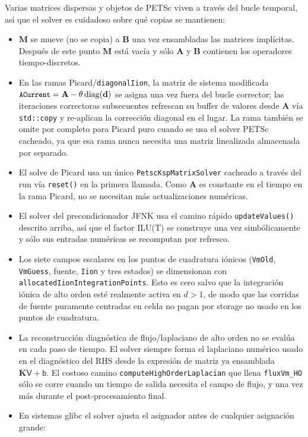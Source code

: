 \documentclass[11pt,a4paper]{article}
\newcommand{\code}[1]{\texttt{\small #1}}
\newcommand{\Mmass}{\mathbf{M}}
\newcommand{\Kstif}{\mathbf{K}}
\newcommand{\Aimp}{\mathbf{A}}
\newcommand{\Bimp}{\mathbf{B}}
\begin{document}
Varias matrices dispersas y objetos de PETSc viven a través del bucle temporal, así que el
solver es cuidadoso sobre qué copias se mantienen:
\begin{itemize}
\item $\Mmass$ se mueve (no se copia) a $\Bimp$ una vez ensambladas las matrices implícitas.
Después de este punto $\Mmass$ está vacía y sólo $\Aimp$ y $\Bimp$ contienen los operadores
tiempo-discretos.
\item En las ramas Picard/\code{diagonalIion}, la matriz de sistema modificada
$\code{ACurrent}=\Aimp-\theta\,\mathrm{diag}(\mathbf{d})$ se asigna una vez fuera del bucle
corrector; las iteraciones correctoras subsecuentes refrescan su buffer de valores desde
$\Aimp$ vía \code{std::copy} y re-aplican la corrección diagonal en el lugar. La rama también
se omite por completo para Picard puro cuando se usa el solver PETSc cacheado, ya que esa rama
nunca necesita una matriz linealizada almacenada por separado.
\item El solve de Picard usa un único \code{PetscKspMatrixSolver} cacheado a través del run vía
\code{reset()} en la primera llamada. Como $\Aimp$ es constante en el tiempo en la rama Picard,
no se necesitan más actualizaciones numéricas.
\item El solver del precondicionador JFNK usa el camino rápido \code{updateValues()} descrito
arriba, así que el factor ILU(T) se construye una vez simbólicamente y sólo sus entradas
numéricas se recomputan por refresco.
\item Los siete campos escalares en los puntos de cuadratura iónicos (\code{VmOld},
\code{VmGuess}, fuente, \code{Iion} y tres estados) se dimensionan con
\code{allocatedIionIntegrationPoints}. Esto es cero salvo que la integración iónica de alto
orden esté realmente activa en $d>1$, de modo que las corridas de fuente puramente centradas
en celda no pagan por storage no usado en los puntos de cuadratura.
\item La reconstrucción diagnóstica de flujo/laplaciano de alto orden no se evalúa en cada paso
de tiempo. El solver siempre forma el laplaciano numérico usado en el diagnóstico del RHS desde
la expresión de matriz ya ensamblada $\Kstif\mathsf{V}+\mathsf{b}$. El costoso camino
\code{computeHighOrderLaplacian} que llena \code{fluxVm\_HO} sólo se corre cuando un tiempo de
salida necesita el campo de flujo, y una vez más durante el post-procesamiento final.
\item En sistemas glibc el solver ajusta el asignador antes de cualquier asignación grande:

\end{itemize}
\end{document}
